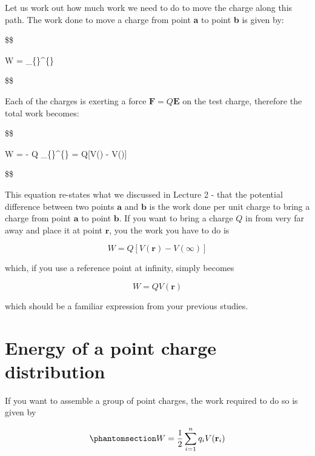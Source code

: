\documentclass[
  letterpaper,
  DIV=11,
  numbers=noendperiod]{scrreprt}
\begin{document}
Let us work out how much work we need to do to move the charge along
this path. The work done to move a charge from point \textbf{a} to point
\textbf{b} is given by:

\$\$

W = \int\_\{\}\^{}\{\}
 \cdot {}  

\$\$

Each of the charges is exerting a force
\(\mathrm{\mathbf{F}}= Q \mathrm{\mathbf{E}}\) on the test charge,
therefore the total work becomes:

\$\$

W = - Q \int\_\{\}\^{}\{\}
 \cdot {}  =
Q{[}V() - V(){]}

\$\$

This equation re-states what we discussed in Lecture 2 - that the
potential difference between two points \(\mathrm{\mathbf{a}}\) and
\(\mathrm{\mathbf{b}}\) is the work done per unit charge to bring a
charge from point \(\mathrm{\mathbf{a}}\) to point
\(\mathrm{\mathbf{b}}\). If you want to bring a charge \(Q\) in from
very far away and place it at point \(\mathrm{\mathbf{r}}\), you the
work you have to do is

\[W = Q[V(\mathrm{\mathbf{r}}) - V(\infty)]\]

which, if you use a reference point at infinity, simply becomes

\[W = Q V(\mathrm{\mathbf{r}})\]

which should be a familiar expression from your previous studies.

\section{Energy of a point charge
distribution}\label{energy-of-a-point-charge-distribution}

If you want to assemble a group of point charges, the work required to
do so is given by

\begin{equation}\phantomsection\label{eq-workMulti}{ W = \frac{1}{2} \sum_{i=1}^n q_i V(\mathrm{\mathbf{r}}_i) }\end{equation}
\end{document}
